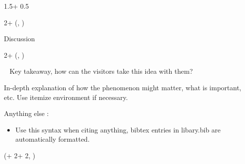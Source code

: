 \documentclass{beamer}
\newlength{\blockFour}
\begin{document}
\begin{frame}[t]
\begin{textblock*}{1.5\colwidth + 0.5\colsep}
\end{textblock*}



\TPshowboxesfalse



\begin{textblock*}{2\colwidth + \colsep}(\leftmargin, \blockFour)

\begin{parblock}{Discussion}
\end{parblock}

\end{textblock*}




\begin{textblock*}{2\colwidth + \colsep}(\leftmargin, \blockFour)

\begin{parblock}{~}  %
	\alert{Key takeaway, how can the visitors take this idea with them?}\vspace{0.333333\baselineskip}

	\noindent In-depth explanation of how the phenomenon might matter, what is important, etc. Use itemize environment if necessary.

	\vspace{0.666667\baselineskip}\noindent%
	\alert{Anything else} :
	\begin{itemize}
		\setlength{\itemsep}{0pt}
		\item Use this syntax when citing anything, bibtex entries in libary.bib are automatically formatted.
	\end{itemize}

\end{parblock}

\end{textblock*}




\begin{textblock*}{\colwidth}(\leftmargin + 2\colwidth + 2\colsep, \blockFour)


\end{textblock*}
\end{frame}
\end{document}

